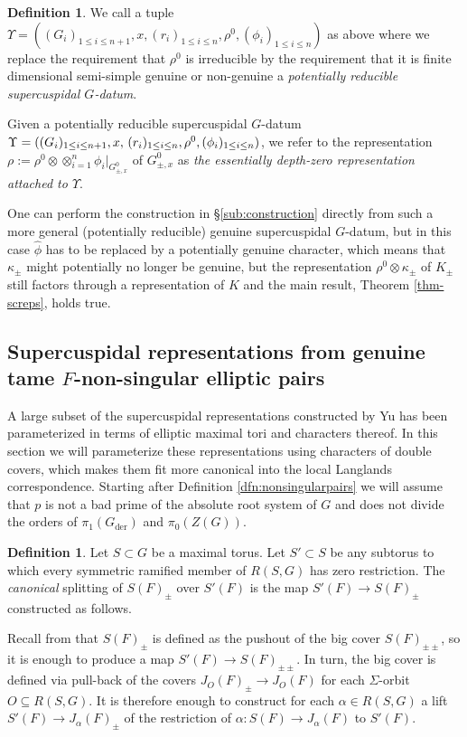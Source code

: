 \documentclass{article}
\def\hat{\widehat}
\theoremstyle{definition}
\newtheorem{dfn}[thm]{Definition}
\numberwithin{equation}{subsection}
\renewcommand{\-}{\hyp{}}
\begin{document}
\begin{dfn}
	We call a tuple \(\Upsilon= ((G_i)_{1\leq i\leq n+1},x,(r_i)_{1\leq i\leq n},\rho^0,(\phi_i)_{1\leq i\leq n}) \)
	as above where we replace the requirement that $\rho^0$ is irreducible by the requirement that it is finite dimensional semi-simple genuine or non-genuine a \emph{potentially reducible supercuspidal $G$-datum}.
	
	Given a potentially reducible supercuspidal $G$-datum \(\Upsilon= ((G_i)_{1\leq i\leq n+1},x,$ $(r_i)_{1\leq i\leq n},\rho^0,(\phi_i)_{1\leq i\leq n}) \), we refer to the representation $\rho:=\rho^0 \otimes \otimes_{i=1}^n \phi_i|_{G_{\pm,x}^{0}}$ of $G^0_{\pm,x}$ as \emph{the essentially depth-zero representation attached to $\Upsilon$}.
\end{dfn}
One can perform the construction in \S\ref{sub:construction} directly from such a more general (potentially reducible) genuine supercuspidal $G$-datum, but in this case $\hat \phi$ has to be replaced by a potentially genuine character, which means that $\kappa_{\pm}$ might potentially no longer be genuine, but the representation $\rho^0 \otimes \kappa_{\pm}$ of $K_{\pm}$ still factors through a representation of $K$ and the main result, Theorem \ref{thm-screps}, holds true.




\subsection{{Supercuspidal representations from genuine tame $F$-non-singular elliptic pairs}{}}
\label{sub:nonsingular}
A large subset of the supercuspidal representations constructed by Yu has been parameterized in terms of elliptic maximal tori and characters thereof. In this section we will parameterize these representations using characters of double covers, which makes them fit more canonical into the local Langlands correspondence. Starting after Definition \ref{dfn:nonsingularpairs} we will assume that $p$ is not a bad prime of the absolute root system of $G$ and does not divide the orders of $\pi_1(G_{\mathrm{der}})$ and $\pi_0(Z(G))$.

\begin{dfn} \label{dfn:splitunram}
	Let $S \subset G$ be a maximal torus. Let $S' \subset S$ be any subtorus to which every symmetric ramified member of $R(S,G)$ has zero restriction. The \emph{canonical} splitting of $S(F)_\pm$ over $S'(F)$ is the map $S'(F) \to S(F)_\pm$ constructed as follows.
\end{dfn}
	Recall from \cite[\S3.1]{KalDC} that $S(F)_\pm$ is defined as the pushout of the big cover $S(F)_{\pm\pm}$, so it is enough to produce a map $S'(F) \to S(F)_{\pm\pm}$. In turn, the big cover is defined via pull-back of the covers $J_O(F)_\pm \to J_O(F)$ for each $\Sigma$-orbit $O \subseteq R(S,G)$. It is therefore enough to construct for each $\alpha \in R(S,G)$ a lift $S'(F) \to J_\alpha(F)_\pm$ of the restriction of $\alpha : S(F) \to J_\alpha(F)$ to $S'(F)$.
\end{document}
